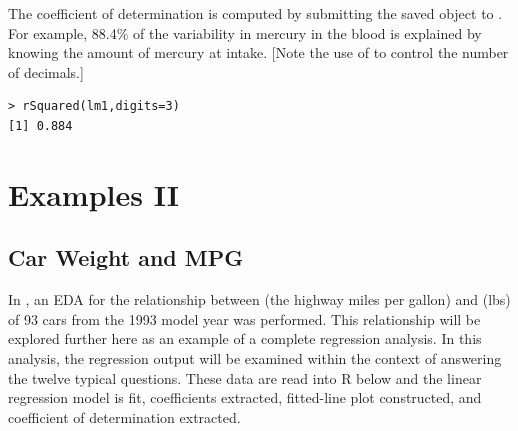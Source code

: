\documentclass[10pt,openany]{book}\usepackage[]{graphicx}\usepackage[]{color}
\makeatletter
\newenvironment{kframe}{%
 \def\at@end@of@kframe{}%
 \ifinner\ifhmode%
  \def\at@end@of@kframe{\end{minipage}}%
  \begin{minipage}{\columnwidth}%
 \fi\fi%
 \def\FrameCommand##1{\hskip\@totalleftmargin \hskip-\fboxsep
 \colorbox{shadecolor}{##1}\hskip-\fboxsep
     \hskip-\linewidth \hskip-\@totalleftmargin \hskip\columnwidth}%
 \MakeFramed {\advance\hsize-\width
   \@totalleftmargin\z@ \linewidth\hsize
   \@setminipage}}%
 {\par\unskip\endMakeFramed%
 \at@end@of@kframe}
\newenvironment{knitrout}{}{} %
\makeatother
\begin{document}
The coefficient of determination is computed by submitting the saved  object to . For example, 88.4\% of the variability in mercury in the blood is explained by knowing the amount of mercury at intake. [Note the use of  to control the number of decimals.]
\begin{knitrout}
\color{fgcolor}\begin{kframe}
\begin{verbatim}
> rSquared(lm1,digits=3)
[1] 0.884
\end{verbatim}
\end{kframe}
\end{knitrout}


\section{Examples II}
\subsection*{Car Weight and MPG}
In , an EDA for the relationship between  (the highway miles per gallon) and  (lbs) of 93 cars from the 1993 model year was performed. This relationship will be explored further here as an example of a complete regression analysis. In this analysis, the regression output will be examined within the context of answering the twelve typical questions. These data are read into R below and the linear regression model is fit, coefficients extracted, fitted-line plot constructed, and coefficient of determination extracted.
\end{document}
